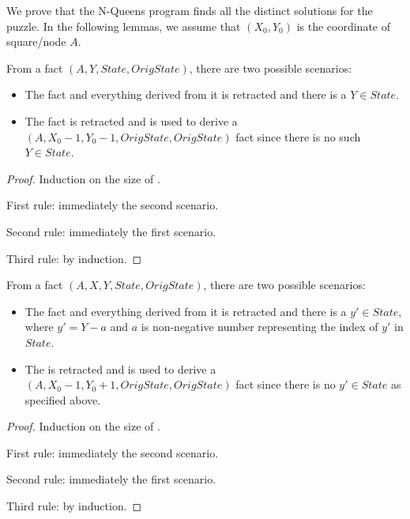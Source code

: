 We prove that the N-Queens program finds all the distinct solutions for the
puzzle. In the following lemmas, we assume that $(X_0, Y_0)$ is the coordinate
of square/node $A$.

\begin{lemma}

From a fact $(A, Y, State, OrigState)$, there are two possible
scenarios:

\begin{itemize}
   \item The  fact and everything derived from it is retracted and
      there is a $Y \in State$.

   \item The  fact is retracted and is used to derive a
      $(A, X_0 - 1, Y_0 - 1,
      OrigState, OrigState)$ fact since 
      there is no such $Y \in State$.

\end{itemize}

\end{lemma}
\begin{proof}
Induction on the size of .

First rule: immediately the second scenario.

Second rule: immediately the first scenario.

Third rule: by induction.
\end{proof}

\begin{lemma}
   From a fact $(A, X, Y, State, OrigState)$, there are
  two possible scenarios:
   
  \begin{itemize}
     \item The  fact and everything derived from it is
        retracted and there is a $y' \in State$, where $y' = Y - a$ and $a$ is
        non-negative number representing the index of $y'$ in $State$.
     \item The  is retracted and is used to derive a
        $(A, X_0 - 1, Y_0 + 1, OrigState, OrigState)$
        fact since there is no $y' \in State$ as specified above.
  \end{itemize}
\end{lemma}
\begin{proof}
Induction on the size of .

First rule: immediately the second scenario.

Second rule: immediately the first scenario.

Third rule: by induction.
\end{proof}

